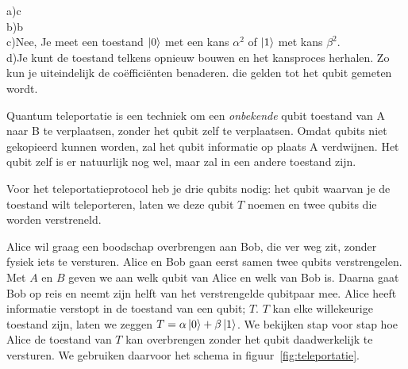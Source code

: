 \documentclass[../../main.tex]{subfiles}
\begin{document}
\begin{antwoord}[-8cm]
a)c\\
b)b\\
c)Nee, Je meet een toestand $\ket{0}$ met een kans $\alpha^2$ of $\ket{1}$ met kans $\beta^2$.\\
d)Je kunt de toestand telkens opnieuw bouwen en het kansproces herhalen. Zo kun je uiteindelijk de co\"effici\"enten benaderen. die gelden tot het qubit gemeten wordt.
\end{antwoord}
Quantum teleportatie is een techniek om een \emph{onbekende} qubit toestand van A naar B te verplaatsen, zonder het qubit zelf te verplaatsen. Omdat qubits niet gekopieerd kunnen worden, zal het qubit informatie op plaats A verdwijnen. Het qubit zelf is er natuurlijk nog wel, maar zal in een andere toestand zijn.

Voor het teleportatieprotocol heb je drie qubits nodig: het qubit waarvan je de toestand wilt teleporteren, laten we deze qubit $T$ noemen en twee qubits die worden verstreneld.

Alice wil graag een boodschap overbrengen aan Bob, die ver weg zit, zonder fysiek iets te versturen. Alice en Bob gaan eerst samen twee qubits verstrengelen. Met $A$ en $B$ geven we aan welk qubit van Alice en welk van Bob is. Daarna gaat Bob op reis en neemt zijn helft van het verstrengelde qubitpaar mee. Alice heeft informatie verstopt in de toestand van een qubit; $T$. $T$ kan elke willekeurige toestand zijn, laten we zeggen $T=\alpha\ket{0}+\beta\ket{1}$. 
We bekijken stap voor stap hoe Alice de toestand van $T$ kan overbrengen zonder het qubit daadwerkelijk te versturen. We gebruiken daarvoor het schema in figuur~\ref{fig:teleportatie}.
\end{document}

